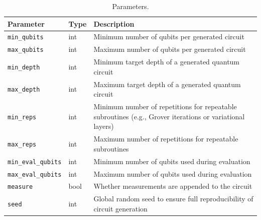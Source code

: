

\begin{table}[t]
  \caption{Parameters.}
  \label{tab:base_params}
  \centering

  {\small
  \setlength{\tabcolsep}{4pt}
  \renewcommand{\arraystretch}{1.0}

  \begin{tabularx}{\linewidth}{@{}l l Y@{}}
    \toprule
    \textbf{Parameter} & \textbf{Type} & \textbf{Description} \\
    \midrule
    \texttt{min\_qubits}
      & int
      & Minimum number of qubits per generated circuit \\

    \texttt{max\_qubits}
      & int
      & Maximum number of qubits per generated circuit \\

    \texttt{min\_depth}
      & int
      & Minimum target depth of a generated quantum circuit \\

    \texttt{max\_depth}
      & int
      & Maximum target depth of a generated quantum circuit \\

    \texttt{min\_reps}
      & int
      & Minimum number of repetitions for repeatable subroutines
        (e.g., Grover iterations or variational layers) \\

    \texttt{max\_reps}
      & int
      & Maximum number of repetitions for repeatable subroutines \\

    \texttt{min\_eval\_qubits}
      & int
      & Minimum number of qubits used during evaluation \\

    \texttt{max\_eval\_qubits}
      & int
      & Maximum number of qubits used during evaluation \\

    \texttt{measure}
      & bool
      & Whether measurements are appended to the circuit \\

    \texttt{seed}
      & int
      & Global random seed to ensure full reproducibility of
        circuit generation \\
    \bottomrule
  \end{tabularx}
  }
\end{table}



